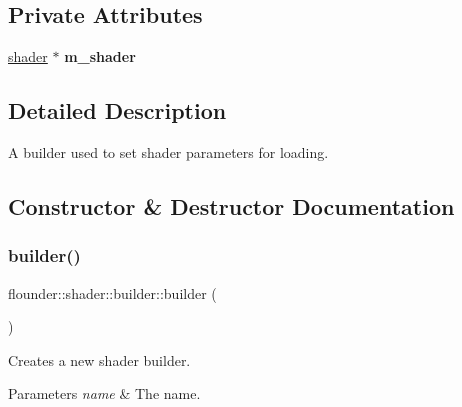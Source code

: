 \subsection*{Private Attributes}
\begin{DoxyCompactItemize}
\item 
\mbox{\label{classflounder_1_1shader_1_1builder_a9c2d80ce0c0cf2fd1737bb15794f6266}} 
\hyperlink{classflounder_1_1shader}{shader} $\ast$ {\bfseries m\+\_\+shader}
\end{DoxyCompactItemize}


\subsection{Detailed Description}
A builder used to set shader parameters for loading. 



\subsection{Constructor \& Destructor Documentation}
\mbox{\label{classflounder_1_1shader_1_1builder_a32776e257f27affda639c94667c07236}} 
\subsubsection{\texorpdfstring{builder()}{builder()}}
{\footnotesize\ttfamily flounder\+::shader\+::builder\+::builder (\begin{DoxyParamCaption}{ }\end{DoxyParamCaption})}



Creates a new shader builder. 


\begin{DoxyParams}{Parameters}
{\em name} & The name. \\
\hline
\end{DoxyParams}
\mbox{\label{classflounder_1_1shader_1_1builder_a80698ba04f5e74ac0a0023384988a55d}} 
